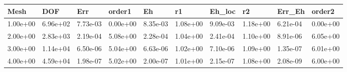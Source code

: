 \begin{tabular}{llllllllll}
Mesh & DOF & Err & order1 & Eh & r1 & Eh_loc & r2 & Err_Eh & order2 \\ 
\hline 
1.00e+00 & 6.96e+02 & 7.73e-03 & 0.00e+00 & 8.35e-03 & 1.08e+00 & 9.09e-03 & 1.18e+00 & 6.21e-04 & 0.00e+00 \\ 
2.00e+00 & 2.83e+03 & 2.19e-04 & 5.08e+00 & 2.28e-04 & 1.04e+00 & 2.41e-04 & 1.10e+00 & 8.91e-06 & 6.05e+00 \\ 
3.00e+00 & 1.14e+04 & 6.50e-06 & 5.04e+00 & 6.63e-06 & 1.02e+00 & 7.10e-06 & 1.09e+00 & 1.35e-07 & 6.01e+00 \\ 
4.00e+00 & 4.59e+04 & 1.98e-07 & 5.02e+00 & 2.00e-07 & 1.01e+00 & 2.15e-07 & 1.08e+00 & 2.08e-09 & 6.00e+00 \\ 
\hline 
\end{tabular}